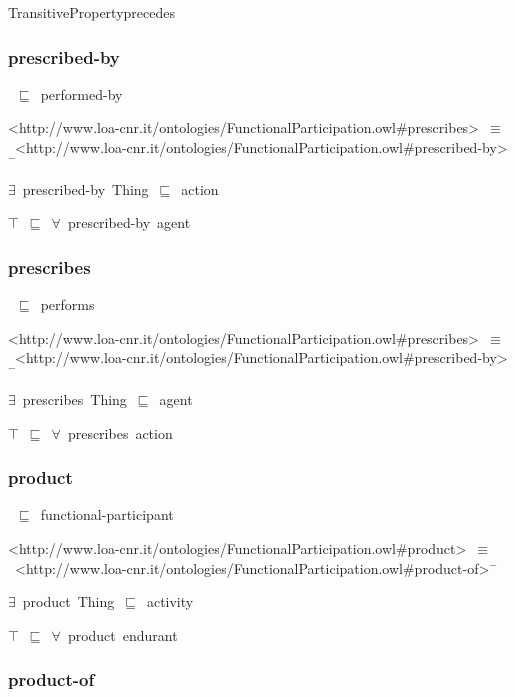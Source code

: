 \documentclass{article}
\begin{document}
TransitivePropertyprecedes

\subsubsection*{prescribed-by}

~\ensuremath{\sqsubseteq}~performed-by

<http://www.loa-cnr.it/ontologies/FunctionalParticipation.owl#prescribes>~\ensuremath{\equiv}~<http://www.loa-cnr.it/ontologies/FunctionalParticipation.owl#prescribed-by>\ensuremath{^-}

\ensuremath{\exists}~prescribed-by~Thing~\ensuremath{\sqsubseteq}~action

\ensuremath{\top}~\ensuremath{\sqsubseteq}~\ensuremath{\forall}~prescribed-by~agent

\subsubsection*{prescribes}

~\ensuremath{\sqsubseteq}~performs

<http://www.loa-cnr.it/ontologies/FunctionalParticipation.owl#prescribes>~\ensuremath{\equiv}~<http://www.loa-cnr.it/ontologies/FunctionalParticipation.owl#prescribed-by>\ensuremath{^-}

\ensuremath{\exists}~prescribes~Thing~\ensuremath{\sqsubseteq}~agent

\ensuremath{\top}~\ensuremath{\sqsubseteq}~\ensuremath{\forall}~prescribes~action

\subsubsection*{product}

~\ensuremath{\sqsubseteq}~functional-participant

<http://www.loa-cnr.it/ontologies/FunctionalParticipation.owl#product>~\ensuremath{\equiv}~<http://www.loa-cnr.it/ontologies/FunctionalParticipation.owl#product-of>\ensuremath{^-}

\ensuremath{\exists}~product~Thing~\ensuremath{\sqsubseteq}~activity

\ensuremath{\top}~\ensuremath{\sqsubseteq}~\ensuremath{\forall}~product~endurant

\subsubsection*{product-of}
\end{document}
